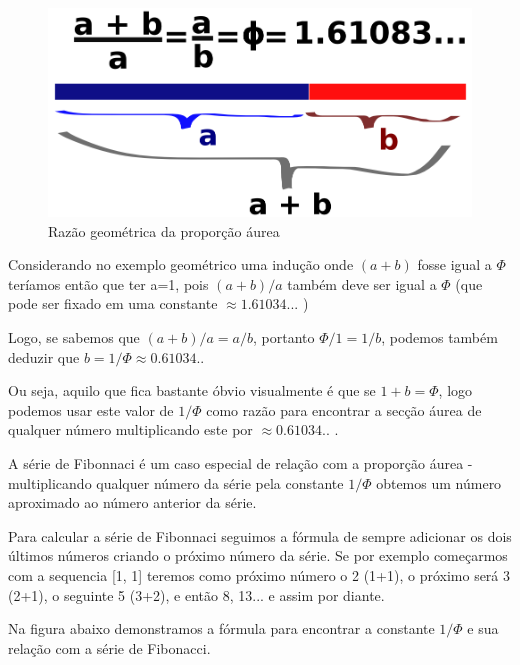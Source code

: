 \documentclass[
	12pt,				%
	openright,			%
	twoside,			%
	a4paper,			%
	english,			%
	french,				%
	spanish,			%
	brazil				%
	]{abntex2}
\begin{document}
\begin{figure}[!h]
	\caption{\label{fig_grafico}Razão geométrica da proporção áurea }
	\begin{center}
	    \includegraphics[scale=0.25]{axis/proportionaurea.png}
	\end{center}
\end{figure}	


Considerando no exemplo geométrico uma indução onde $(a+b)$ fosse igual a $\Phi$ teríamos então que ter a=1, pois $(a+b)/a$ também deve ser igual a $\Phi$ (que pode ser fixado em uma constante  $ \approx 1.61034... $ ) 

Logo, se sabemos que $(a+b)/a = a/b $, portanto $\Phi/1 = 1/b$, podemos também deduzir que $b = 1/\Phi \approx 0.61034.. $ 

Ou seja, aquilo que fica bastante óbvio visualmente é que se $1+b = \Phi$, logo podemos usar este valor de $1/\Phi$ como razão para encontrar a secção áurea de qualquer número multiplicando este por $ \approx 0.61034.. $ .

A série de Fibonnaci é um caso especial de relação com a proporção áurea - multiplicando qualquer número da série pela constante $1/\Phi$ obtemos um número aproximado ao número anterior da série.

Para calcular a série de Fibonnaci seguimos a fórmula de sempre adicionar os dois últimos números criando o próximo número da série. Se por exemplo começarmos com a sequencia [1, 1] teremos como próximo número o 2 (1+1), o próximo será 3 (2+1), o seguinte 5 (3+2), e então 8, 13... e assim por diante. 

Na figura abaixo demonstramos a fórmula para encontrar a constante $1/\Phi$ e sua relação com a série de Fibonacci.
\end{document}

